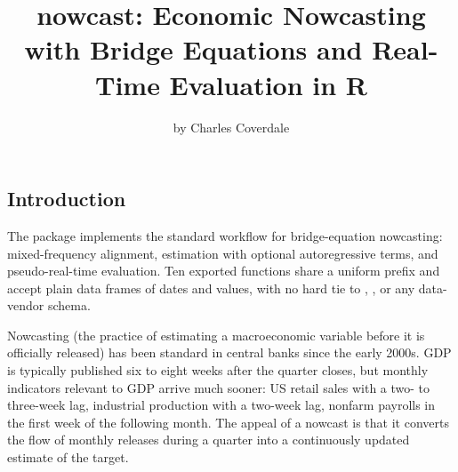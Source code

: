 \title{nowcast: Economic Nowcasting with Bridge Equations and Real-Time
Evaluation in R}
\author{by Charles Coverdale}

\maketitle


\subsection{Introduction}\label{introduction}

The  package implements the standard workflow for
bridge-equation nowcasting: mixed-frequency alignment, estimation with
optional autoregressive terms, and pseudo-real-time evaluation. Ten
exported functions share a uniform  prefix and accept plain
data frames of dates and values, with no hard tie to ,
, or any data-vendor schema.

Nowcasting (the practice of estimating a macroeconomic variable before
it is officially released) has been standard in central banks since the
early 2000s. GDP is typically published six to eight weeks after the
quarter closes, but monthly indicators relevant to GDP arrive much
sooner: US retail sales with a two- to three-week lag, industrial
production with a two-week lag, nonfarm payrolls in the first week of
the following month. The appeal of a nowcast is that it converts the
flow of monthly releases during a quarter into a continuously updated
estimate of the target.

